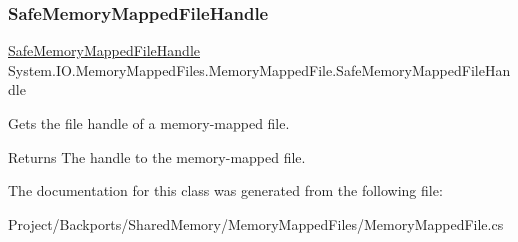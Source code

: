 \subsubsection{\texorpdfstring{Safe\+Memory\+Mapped\+File\+Handle}{SafeMemoryMappedFileHandle}}
{\footnotesize\ttfamily \hyperlink{class_microsoft_1_1_win32_1_1_safe_handles_1_1_safe_memory_mapped_file_handle}{Safe\+Memory\+Mapped\+File\+Handle} System.\+I\+O.\+Memory\+Mapped\+Files.\+Memory\+Mapped\+File.\+Safe\+Memory\+Mapped\+File\+Handle\hspace{0.3cm}{\ttfamily [get]}}



Gets the file handle of a memory-\/mapped file. 

\begin{DoxyReturn}{Returns}
The handle to the memory-\/mapped file.
\end{DoxyReturn}


The documentation for this class was generated from the following file\+:\begin{DoxyCompactItemize}
\item 
Project/\+Backports/\+Shared\+Memory/\+Memory\+Mapped\+Files/Memory\+Mapped\+File.\+cs\end{DoxyCompactItemize}
